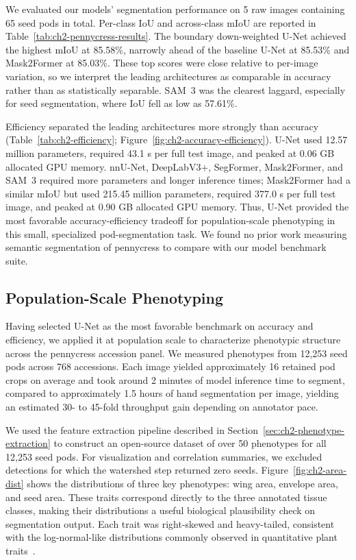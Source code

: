 We evaluated our models' segmentation performance on 5 raw images containing 65 seed pods in total. Per-class IoU and across-class mIoU are reported in Table~\ref{tab:ch2-pennycress-results}. The boundary down-weighted U-Net achieved the highest mIoU at 85.58\%, narrowly ahead of the baseline U-Net at 85.53\% and Mask2Former at 85.03\%. These top scores were close relative to per-image variation, so we interpret the leading architectures as comparable in accuracy rather than as statistically separable. SAM~3 was the clearest laggard, especially for seed segmentation, where IoU fell as low as 57.61\%.

Efficiency separated the leading architectures more strongly than accuracy (Table~\ref{tab:ch2-efficiency}; Figure~\ref{fig:ch2-accuracy-efficiency}). U-Net used 12.57 million parameters, required 43.1 s per full test image, and peaked at 0.06 GB allocated GPU memory. nnU-Net, DeepLabV3+, SegFormer, Mask2Former, and SAM~3 required more parameters and longer inference times; Mask2Former had a similar mIoU but used 215.45 million parameters, required 377.0 s per full test image, and peaked at 0.90 GB allocated GPU memory. Thus, U-Net provided the most favorable accuracy-efficiency tradeoff for population-scale phenotyping in this small, specialized pod-segmentation task. We found no prior work measuring semantic segmentation of pennycress to compare with our model benchmark suite.

\subsection{Population-Scale Phenotyping}

Having selected U-Net as the most favorable benchmark on accuracy and efficiency, we applied it at population scale to characterize phenotypic structure across the pennycress accession panel. We measured phenotypes from 12,253 seed pods across 768 accessions. Each image yielded approximately 16 retained pod crops on average and took around 2 minutes of model inference time to segment, compared to approximately 1.5 hours of hand segmentation per image, yielding an estimated 30- to 45-fold throughput gain depending on annotator pace.

We used the feature extraction pipeline described in Section~\ref{sec:ch2-phenotype-extraction} to construct an open-source dataset of over 50 phenotypes for all 12,253 seed pods. For visualization and correlation summaries, we excluded detections for which the watershed step returned zero seeds. Figure~\ref{fig:ch2-area-dist} shows the distributions of three key phenotypes: wing area, envelope area, and seed area. These traits correspond directly to the three annotated tissue classes, making their distributions a useful biological plausibility check on segmentation output. Each trait was right-skewed and heavy-tailed, consistent with the log-normal-like distributions commonly observed in quantitative plant traits~\cite{TRY}.

